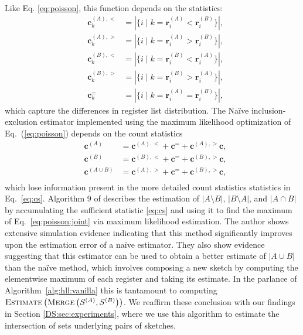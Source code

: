 \documentclass[10]{report}
\newcommand{\algoname}[1]{\textnormal{\textsc{#1}}}
\begin{document}
%
Like Eq. \eqref{eq:poisson}, this function depends on the statistics:
%
\begin{equation} \label{eq:cs}
	\begin{alignedat}{2}
		&\mathbf{c}^{(A),<}_k &= |\{i \mid k = \mathbf{r}^{(A)}_i < \mathbf{r}^{(B)}_i \}|, \\
		&\mathbf{c}^{(A),>}_k &= |\{i \mid k = \mathbf{r}^{(A)}_i > \mathbf{r}^{(B)}_i \}|, \\
		&\mathbf{c}^{(B),<}_k &= |\{i \mid k = \mathbf{r}^{(B)}_i < \mathbf{r}^{(A)}_i \}|, \\ 
		&\mathbf{c}^{(B),>}_k &= |\{i \mid k = \mathbf{r}^{(B)}_i > \mathbf{r}^{(A)}_i \}|, \\
		&\mathbf{c}^{=}_k &= |\{i \mid k = \mathbf{r}^{(A)}_i = \mathbf{r}^{(B)}_i \}|,
  \end{alignedat}
\end{equation} 
%
which capture the differences in register list distribution.
The Na\"ive inclusion-exclusion estimator implemented using the maximum likelihood optimization of Eq.~(\ref{eq:poisson}) depends on the count statistics %
\begin{equation} \label{eq:naivecs}
	\begin{alignedat}{2}
		&\mathbf{c}^{(A)} &= \mathbf{c}^{(A),<} + \mathbf{c}^= + \mathbf{c}^{(A),>}\mathbf{c}, \\
		&\mathbf{c}^{(B)} &= \mathbf{c}^{(B),<} + \mathbf{c}^= + \mathbf{c}^{(B),>}\mathbf{c}, \\
		&\mathbf{c}^{(A \cup B)} &= \mathbf{c}^{(A),>} + \mathbf{c}^= + \mathbf{c}^{(B),>}\mathbf{c}, \\
  \end{alignedat}
\end{equation} 
%
which lose information present in the more detailed count statistics statistics in Eq.~\eqref{eq:cs}.
Algorithm 9 of \cite{ertl2017new} describes the estimation of $|A \setminus B|$, $|B \setminus A|$, and $|A \cap B|$ by accumulating the sufficient statistic \eqref{eq:cs} and using it to find the maximum of Eq.~\eqref{eq:poisson:joint} via maximum likelihood estimation.
The author shows extensive simulation evidence indicating that this method significantly improves upon the estimation error of a na\"ive estimator.
They also show evidence suggesting that this estimator can be used to obtain a better estimate of $|A \cup B|$ than the na\"ive method, which involves composing a new sketch by computing the elementwise maximum of each register and taking its estimate.
In the parlance of Algorithm~\ref{alg:hll:vanilla} this is tantamount to computing $\algoname{Estimate} \left ( \algoname{Merge} \left ( S^{(A)}, S^{(B)} \right ) \right )$. 
We reaffirm these conclusion with our findings in Section \ref{DS:sec:experiments}, where we use this algorithm to estimate the intersection of sets underlying pairs of sketches.
\end{document}
